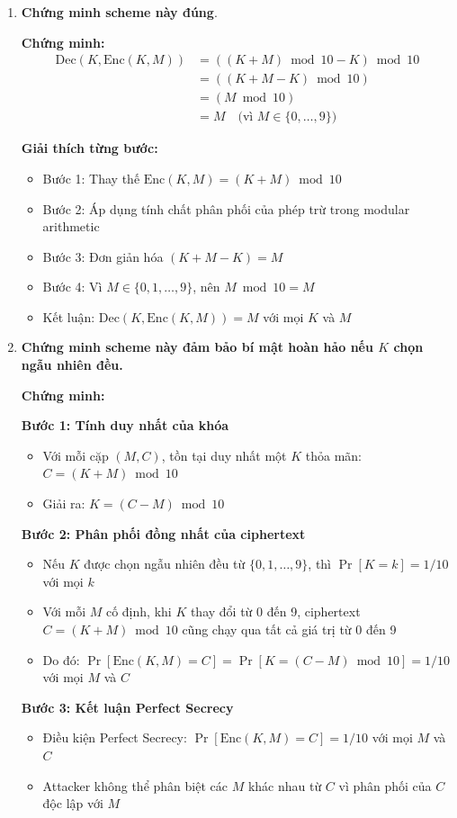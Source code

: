 \begin{enumerate}
    \item \textbf{Chứng minh scheme này đúng}.
    
    \textbf{Chứng minh:}
    \begin{align}
        \text{Dec}(K, \text{Enc}(K, M)) &= ((K + M) \bmod 10 - K) \bmod 10 \\
        &= ((K + M - K) \bmod 10) \\
        &= (M \bmod 10) \\
        &= M \quad \text{(vì } M \in \{0,\ldots,9\}\text{)}
    \end{align}
    
    \textbf{Giải thích từng bước:}
    \begin{itemize}
        \item Bước 1: Thay thế $\text{Enc}(K,M) = (K + M) \bmod 10$
        \item Bước 2: Áp dụng tính chất phân phối của phép trừ trong modular arithmetic
        \item Bước 3: Đơn giản hóa $(K + M - K) = M$
        \item Bước 4: Vì $M \in \{0,1,\ldots,9\}$, nên $M \bmod 10 = M$
        \item Kết luận: $\text{Dec}(K, \text{Enc}(K,M)) = M$ với mọi $K$ và $M$
    \end{itemize}
    
    \item \textbf{Chứng minh scheme này đảm bảo bí mật hoàn hảo nếu $K$ chọn ngẫu nhiên đều.}
    
    \textbf{Chứng minh:}
    
    \textbf{Bước 1: Tính duy nhất của khóa}
    \begin{itemize}
        \item Với mỗi cặp $(M, C)$, tồn tại duy nhất một $K$ thỏa mãn: $C = (K + M) \bmod 10$
        \item Giải ra: $K = (C - M) \bmod 10$
    \end{itemize}
    
    \textbf{Bước 2: Phân phối đồng nhất của ciphertext}
    \begin{itemize}
        \item Nếu $K$ được chọn ngẫu nhiên đều từ $\{0,1,\ldots,9\}$, thì $\Pr[K = k] = 1/10$ với mọi $k$
        \item Với mỗi $M$ cố định, khi $K$ thay đổi từ 0 đến 9, ciphertext $C = (K + M) \bmod 10$ cũng chạy qua tất cả giá trị từ 0 đến 9
        \item Do đó: $\Pr[\text{Enc}(K,M) = C] = \Pr[K = (C-M) \bmod 10] = 1/10$ với mọi $M$ và $C$
    \end{itemize}
    
    \textbf{Bước 3: Kết luận Perfect Secrecy}
    \begin{itemize}
        \item Điều kiện Perfect Secrecy: $\Pr[\text{Enc}(K,M) = C] = 1/10$ với mọi $M$ và $C$
        \item Attacker không thể phân biệt các $M$ khác nhau từ $C$ vì phân phối của $C$ độc lập với $M$
    \end{itemize}
\end{enumerate}

